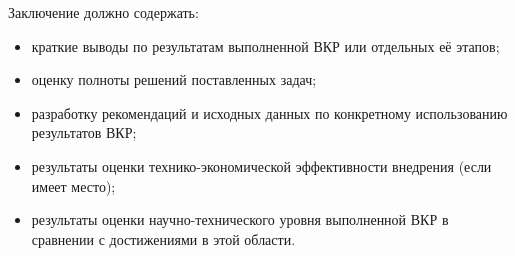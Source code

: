 
Заключение должно содержать:
\begin{itemize}
  \item краткие выводы по результатам выполненной ВКР или отдельных её этапов;
  \item оценку полноты решений поставленных задач;
  \item разработку рекомендаций и исходных данных по конкретному использованию результатов ВКР;
  \item результаты оценки технико-экономической эффективности внедрения (если имеет место);
  \item результаты оценки научно-технического уровня выполненной ВКР в сравнении с достижениями в этой области.
\end{itemize}

